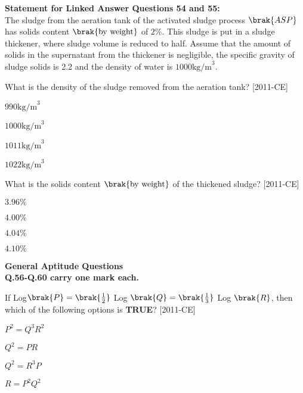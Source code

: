 \textbf{Statement for Linked Answer Questions 54 and 55:}\\
The sludge from the aeration tank of the activated sludge process $\brak{ASP}$ has solids content $\brak{\text{by weight}}$ of $2\%$. This sludge is put in a sludge thickener, where sludge volume is reduced to half. Assume that the amount of solids in the supernatant from the thickener is negligible, the specific gravity of sludge solids is 2.2 and the density of water is $1000\text{kg/m}^3$.\\
\item What is the density of the sludge removed from the aeration tank? \hfill{[2011-CE]}
\begin{enumerate}
\begin{multicols}{4}
\item $990\text{kg/m}^3$
\item $1000\text{kg/m}^3$
\item $1011\text{kg/m}^3$
\item $1022\text{kg/m}^3$
\end{multicols}
\end{enumerate}
\item What is the solids content $\brak{\text{by weight}}$ of the thickened sludge? \hfill{[2011-CE]}
\begin{enumerate}
\begin{multicols}{4}
\item $3.96\%$
\item $4.00\%$
\item $4.04\%$
\item $4.10\%$
\end{multicols}
\end{enumerate}
\textbf{General Aptitude  Questions}\\
\textbf{Q.56-Q.60 carry one mark each.}\\
\item If Log$\brak{P}=\brak{\frac{1}{2}}$ Log $\brak{Q}=\brak{\frac{1}{3}}$ Log $\brak{R}$, then which of the following options is \textbf{TRUE}? \hfill{[2011-CE]}
\begin{enumerate}
\begin{multicols}{4}
\item $P^2=Q^3R^2$
\item $Q^2=PR$
\item $Q^2=R^3P$
\item $R=P^2Q^2$
\end{multicols}
\end{enumerate}

